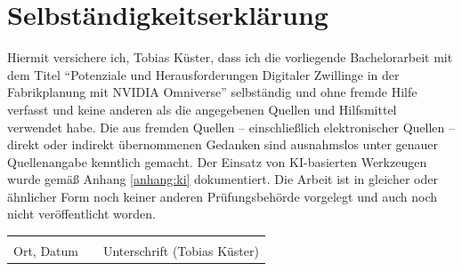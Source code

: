 \newpage
\section*{Selbständigkeitserklärung}
Hiermit versichere ich, Tobias Küster, dass ich die vorliegende Bachelorarbeit mit dem Titel \enquote{Potenziale und Herausforderungen Digitaler Zwillinge in der Fabrikplanung mit NVIDIA Omniverse} selbständig und ohne fremde Hilfe verfasst und keine anderen als die angegebenen Quellen und Hilfsmittel verwendet habe. Die aus fremden Quellen -- einschließlich elektronischer Quellen -- direkt oder indirekt übernommenen Gedanken sind ausnahmslos unter genauer Quellenangabe kenntlich gemacht. Der Einsatz von KI-basierten Werkzeugen wurde gemäß Anhang \ref{anhang:ki} dokumentiert. Die Arbeit ist in gleicher oder ähnlicher Form noch keiner anderen Prüfungsbehörde vorgelegt und auch noch nicht veröffentlicht worden.

\vspace{2cm}
\noindent\begin{tabular}{p{6cm}p{1cm}p{6cm}}
\hrulefill & & \hrulefill \\
Ort, Datum & & Unterschrift (Tobias Küster) \\
\end{tabular}
